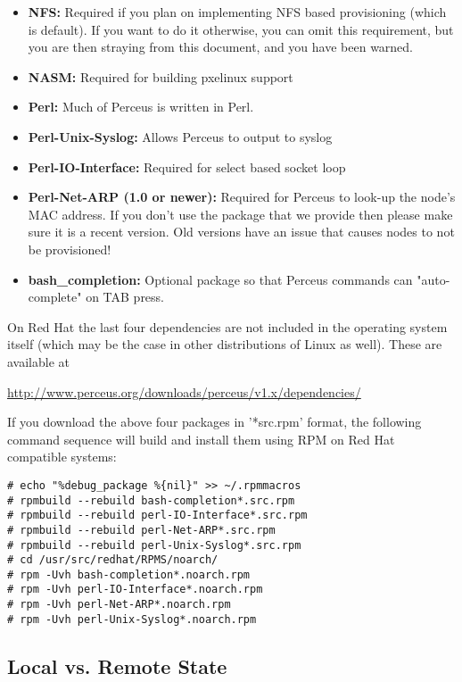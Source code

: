 \documentclass[10pt,letterpaper]{report}
\begin{document}
\begin{itemize}

\item {\bf NFS:} Required if you plan on implementing NFS based provisioning
(which is default). If you want to do it otherwise, you can omit this
requirement, but you are then straying from this document, and you have been
warned.
\item {\bf NASM:} Required for building pxelinux support
\item {\bf Perl:} Much of Perceus is written in Perl.
\item {\bf Perl-Unix-Syslog:} Allows Perceus to output to syslog
\item {\bf Perl-IO-Interface:} Required for select based socket loop
\item {\bf Perl-Net-ARP (1.0 or newer):} Required for Perceus to look-up the
node's MAC address. If you don't use the package that we provide then please
make sure it is a recent version. Old versions have an issue that causes
nodes to not be provisioned!
\item {\bf bash\_completion:} Optional package so that Perceus commands can 
"auto-complete" on TAB press.

\end{itemize}

\noindent On Red Hat the last four dependencies are not included in the
operating system itself (which may be the case in other distributions of Linux
as well).  These are available at

{\ttfamily
\indent \url{http://www.perceus.org/downloads/perceus/v1.x/dependencies/}
}

\noindent If you download the above four packages in '*src.rpm' format, the
following command sequence will build and install them using RPM on Red Hat
compatible systems:

\begin{verbatim}
# echo "%debug_package %{nil}" >> ~/.rpmmacros
# rpmbuild --rebuild bash-completion*.src.rpm
# rpmbuild --rebuild perl-IO-Interface*.src.rpm
# rpmbuild --rebuild perl-Net-ARP*.src.rpm
# rpmbuild --rebuild perl-Unix-Syslog*.src.rpm
# cd /usr/src/redhat/RPMS/noarch/
# rpm -Uvh bash-completion*.noarch.rpm
# rpm -Uvh perl-IO-Interface*.noarch.rpm
# rpm -Uvh perl-Net-ARP*.noarch.rpm
# rpm -Uvh perl-Unix-Syslog*.noarch.rpm
\end{verbatim}

\subsection{Local vs. Remote State}
\end{document}
